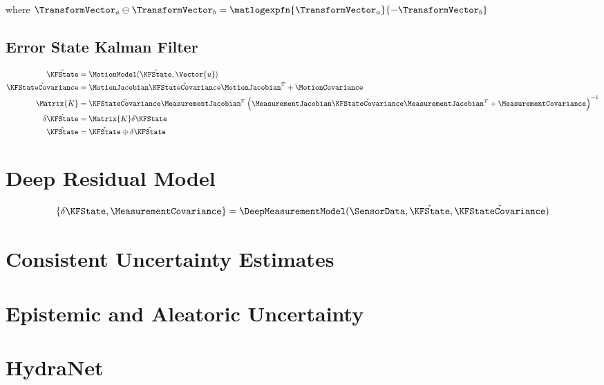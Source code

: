 where $\TransformVector_a \ominus \TransformVector_b = \matlogexpfn{\TransformVector_a}{-\TransformVector_b}$ 


\subsection{Error State Kalman Filter}

\begin{align}
			    \check{\KFState} &= \MotionModel(\hat{\KFState}, \Vector{u}) \\
			    \check{\KFStateCovariance} &= \MotionJacobian \hat{\KFStateCovariance} \MotionJacobian^T + \MotionCovariance \\
			   \Matrix{K} &= \check{\KFStateCovariance}\MeasurementJacobian^T\left(\MeasurementJacobian \check{\KFStateCovariance}\MeasurementJacobian^T + \MeasurementCovariance\right)^{-1} \\
	\delta \hat{\KFState} &= \Matrix{K} \delta \KFState \\
	\hat{\KFState} &= \check{\KFState} \oplus \delta \hat{\KFState}
\end{align}


\section{Deep Residual Model}


\begin{align}
\left\{\delta \KFState,  \MeasurementCovariance \right\} &= \DeepMeasurementModel(\SensorData, \check{\KFState}, \check{\KFStateCovariance}) \\
\end{align}



\section{Consistent Uncertainty Estimates}
\section{Epistemic and Aleatoric Uncertainty}

\section{HydraNet}


